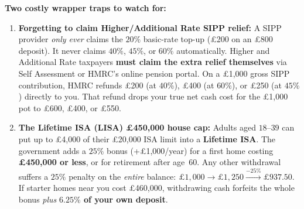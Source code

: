 \begin{trapbox}
\textbf{Two costly wrapper traps to watch for:}
\begin{enumerate}
  \item \textbf{Forgetting to claim Higher/Additional Rate SIPP relief:} A SIPP provider \emph{only ever} claims the $20\%$ basic-rate top-up (\pounds 200 on an \pounds 800 deposit). It never claims $40\%$, $45\%$, or $60\%$ automatically. Higher and Additional Rate taxpayers \textbf{must claim the extra relief themselves} via Self Assessment or HMRC's online pension portal. On a \pounds 1,000 gross SIPP contribution, HMRC refunds \pounds 200 (at $40\%$), \pounds 400 (at $60\%$), or \pounds 250 (at $45\%$) directly to you. That refund drops your true net cash cost for the \pounds 1,000 pot to \pounds 600, \pounds 400, or \pounds 550.
  \item \textbf{The Lifetime ISA (LISA) \pounds 450,000 house cap:} Adults aged $18$--$39$ can put up to \pounds 4,000 of their \pounds 20,000 ISA limit into a \textbf{Lifetime ISA}. The government adds a $25\%$ bonus (+\pounds 1,000/year) for a first home costing \textbf{\pounds 450,000 or less}, or for retirement after age~$60$. Any other withdrawal suffers a $25\%$ penalty on the \emph{entire} balance: $\pounds 1{,}000 \to \pounds 1{,}250 \xrightarrow{-25\%} \pounds 937.50$. If starter homes near you cost \pounds 460,000, withdrawing cash forfeits the whole bonus \emph{plus} \textbf{$6.25\%$ of your own deposit}.
\end{enumerate}
\end{trapbox}


